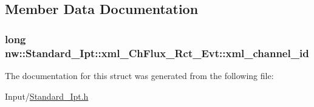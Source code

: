\subsection{Member Data Documentation}
\hypertarget{structnw_1_1_standard___ipt_1_1xml___ch_flux___rct___evt_aa0a4cb6a01e33f4cc0162b1d49a3041c}{
\subsubsection[{xml\+\_\+channel\+\_\+id}]{\setlength{\rightskip}{0pt plus 5cm}long nw\+::\+Standard\+\_\+\+Ipt\+::xml\+\_\+\+Ch\+Flux\+\_\+\+Rct\+\_\+\+Evt\+::xml\+\_\+channel\+\_\+id}}\label{structnw_1_1_standard___ipt_1_1xml___ch_flux___rct___evt_aa0a4cb6a01e33f4cc0162b1d49a3041c}


The documentation for this struct was generated from the following file\+:\begin{DoxyCompactItemize}
\item 
Input/\hyperlink{_standard___ipt_8h}{Standard\+\_\+\+Ipt.\+h}\end{DoxyCompactItemize}

